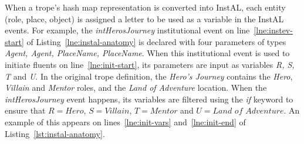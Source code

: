 \documentclass[11pt]{report}
\begin{document}
When a trope's hash map representation is converted into InstAL, each entity
(role, place, object) is assigned a letter to be used as a variable in the
InstAL events. For example, the \emph{intHerosJourney} institutional event on
line~\ref{lne:instev-start} of Listing~\ref{lne:instal-anatomy} is declared with four parameters of types
\emph{Agent, Agent, PlaceName, PlaceName}. When this institutional event is used
to initiate fluents on line~\ref{lne:init-start}, its parameters are input as
variables \emph{R, S, T} and \emph{U}. In the original trope definition, the
\emph{Hero's Journey} contains the \emph{Hero}, \emph{Villain} and \emph{Mentor}
roles, and the \emph{Land of Adventure} location. When the
\emph{intHerosJourney} event happens, its variables are filtered using the
\emph{if} keyword to ensure that $R = \textit{Hero}$, $S = \textit{Villain}$, $T
= \textit{Mentor}$ and $U = \textit{Land of Adventure}$. An example of this
appears on lines~\ref{lne:init-vars} and~\ref{lne:init-end} of Listing~\ref{lst:instal-anatomy}.
\end{document}
